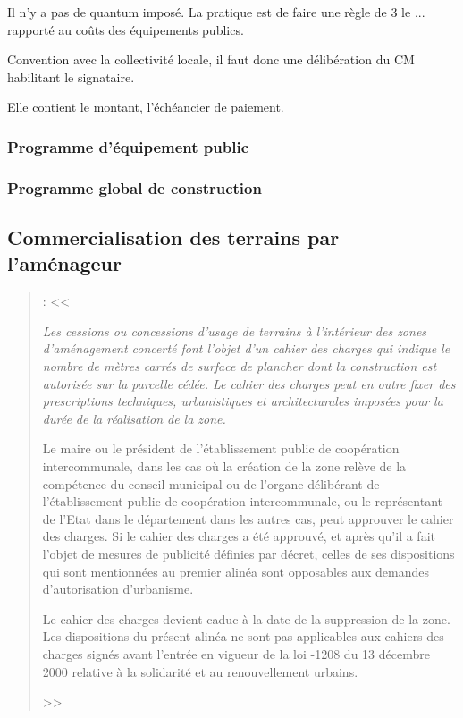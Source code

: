 		Il n'y a pas de quantum imposé. La pratique est de faire une règle de 3 le ... rapporté au coûts des équipements publics.
		
		Convention avec la collectivité locale, il faut donc une délibération du CM habilitant le signataire.
		
		Elle contient le montant, l'échéancier de paiement. 
		

		\subsubsection{Programme d'équipement public}

		\subsubsection{Programme global de construction}

	\subsection{Commercialisation des terrains par l'aménageur}
		
		\begin{quote}
			\textbf{} :
			<< 
			{\itshape Les cessions ou concessions d'usage de terrains à l'intérieur des zones d'aménagement concerté font l'objet d'un cahier des charges qui indique le nombre de mètres carrés de surface de plancher dont la construction est autorisée sur la parcelle cédée. Le cahier des charges peut en outre fixer des prescriptions techniques, urbanistiques et architecturales imposées pour la durée de la réalisation de la zone.
				
			\medskip Le maire ou le président de l'établissement public de coopération intercommunale, dans les cas où la création de la zone relève de la compétence du conseil municipal ou de l'organe délibérant de l'établissement public de coopération intercommunale, ou le représentant de l'Etat dans le département dans les autres cas, peut approuver le cahier des charges. Si le cahier des charges a été approuvé, et après qu'il a fait l'objet de mesures de publicité définies par décret, celles de ses dispositions qui sont mentionnées au premier alinéa sont opposables aux demandes d'autorisation d'urbanisme.
			
			\medskip Le cahier des charges devient caduc à la date de la suppression de la zone. Les dispositions du présent alinéa ne sont pas applicables aux cahiers des charges signés avant l'entrée en vigueur de la loi -1208 du 13 décembre 2000 relative à la solidarité et au renouvellement urbains.} >>
		\end{quote}
		
